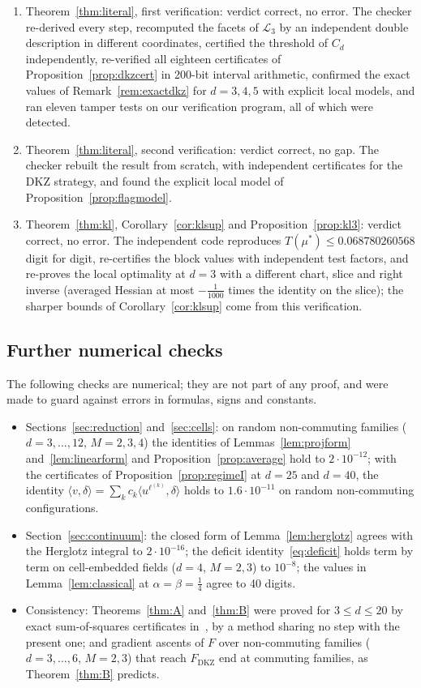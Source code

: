 \documentclass[11pt]{amsart}
\theoremstyle{definition}
\theoremstyle{remark}
\numberwithin{equation}{section}
\newcommand{\FD}{F_{\mathrm{DKZ}}}
\newcommand{\ip}[2]{\langle #1,#2\rangle}
\newcommand{\cL}{\mathcal{L}}
\begin{document}
\begin{enumerate}
\item Theorem~\ref{thm:literal}, first verification: verdict correct, no error. The checker re-derived every step,
recomputed the facets of $\cL_3$ by an independent double description in different coordinates, certified the
threshold of $C_d$ independently, re-verified all eighteen certificates of Proposition~\ref{prop:dkzcert} in 200-bit
interval arithmetic, confirmed the exact values of Remark~\ref{rem:exactdkz} for $d=3,4,5$ with explicit local models,
and ran eleven tamper tests on our verification program, all of which were detected.
\item Theorem~\ref{thm:literal}, second verification: verdict correct, no gap. The checker rebuilt the result from
scratch, with independent certificates for the DKZ strategy, and found the explicit local model of
Proposition~\ref{prop:flagmodel}.
\item Theorem~\ref{thm:kl}, Corollary~\ref{cor:klsup} and Proposition~\ref{prop:kl3}: verdict correct, no error. The
independent code reproduces $T(\mu^*)\le0.068780260568$ digit for digit, re-certifies the block values with independent
test factors, and re-proves the local optimality at $d=3$ with a different chart, slice and right inverse (averaged
Hessian at most $-\frac1{1000}$ times the identity on the slice); the sharper bounds of Corollary~\ref{cor:klsup} come
from this verification.
\end{enumerate}

\subsection{Further numerical checks}
The following checks are numerical; they are not part of any proof, and were made to guard against errors in formulas,
signs and constants.
\begin{itemize}
\item Sections~\ref{sec:reduction} and~\ref{sec:cells}: on random non-commuting families ($d=3,\dots,12$, $M=2,3,4$) the
identities of Lemmas~\ref{lem:projform} and~\ref{lem:linearform} and Proposition~\ref{prop:average} hold to $2\cdot10^{-12}$;
with the certificates of Proposition~\ref{prop:regimeI} at $d=25$ and $d=40$, the identity
$\ip v\delta=\sum_kc_k\ip{u^{\ell^{(k)}}}\delta$ holds to $1.6\cdot10^{-11}$ on random non-commuting configurations.
\item Section~\ref{sec:continuum}: the closed form of Lemma~\ref{lem:herglotz} agrees with the Herglotz integral to
$2\cdot10^{-16}$; the deficit identity~\eqref{eq:deficit} holds term by term on cell-embedded fields ($d=4$, $M=2,3$) to
$10^{-8}$; the values in Lemma~\ref{lem:classical} at $\alpha=\beta=\frac14$ agree to 40 digits.
\item Consistency: Theorems~\ref{thm:A} and~\ref{thm:B} were proved for $3\le d\le20$ by exact sum-of-squares certificates
in~\cite{repo-cglmp}, by a method sharing no step with the present one; and gradient ascents of $F$ over non-commuting
families ($d=3,\dots,6$, $M=2,3$) that reach $\FD$ end at commuting families, as Theorem~\ref{thm:B} predicts.
\end{itemize}
\end{document}
